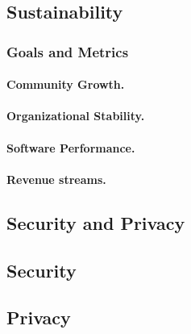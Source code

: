 \documentclass[11pt]{article}
\begin{document}
\subsection{Sustainability}
\subsubsection{Goals and Metrics}
\paragraph{Community Growth.}
\paragraph{Organizational Stability.}
\paragraph{Software Performance.}
\paragraph{Revenue streams.}

\subsection{Security and Privacy}
\subsection{Security}
\subsection{Privacy}

\newpage
\printbibliography
\end{document}
